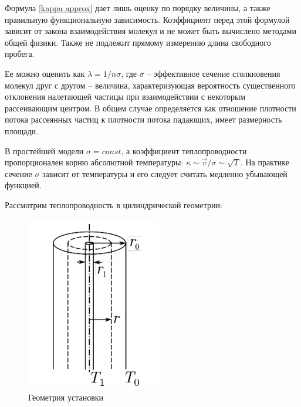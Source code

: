 \documentclass[a4paper,12pt]{report}
\begin{document}
    Формула \eqref{kappa approx} дает лишь оценку по порядку величины, а также правильную функциональную зависимость. Коэффициент перед этой формулой зависит от закона взаимодействия молекул и не может быть вычислено методами общей физики. Также не подлежит прямому измерению длина свободного пробега.

    Ее можно оценить как $\lambda=1/n\sigma$, где $\sigma$ -- эффективное сечение столкновения молекул друг с другом -- величина, характеризующая вероятность существенного отклонения налетающей частицы при взаимодействии с некоторым рассеивающим центром. В общем случае определяется как отношение плотности потока рассеянных частиц к плотности потока падающих, имеет размерность площади.

    В простейшей модели $\sigma=const$, а коэффициент теплопроводности пропорционален корню абсолютной температуры: $\kappa\sim\vec{v}/\sigma\sim\sqrt{T}$. На практике сечение $\sigma$ зависит от температуры и его следует считать медленно убывающей функцией.

    Рассмотрим теплопроводность в цилиндрической геометрии:
    \begin{figure}
        \vspace{-5mm}
        \centering
        \includegraphics[width=0.7\linewidth]{img/geometry}
        \caption{Геометрия установки}
    \end{figure}
\end{document}
